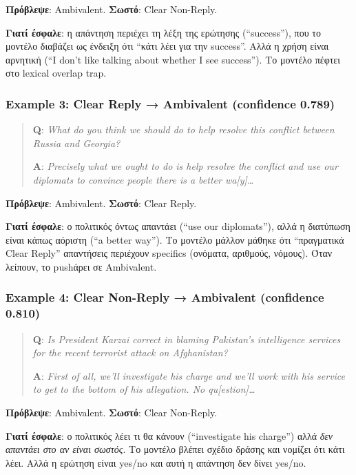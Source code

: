 \documentclass[12pt]{fphw}
\begin{document}
\textbf{Πρόβλεψε}: Ambivalent. \textbf{Σωστό}: Clear Non-Reply.

\textbf{Γιατί έσφαλε}: η απάντηση περιέχει τη λέξη της ερώτησης (``success''), που το μοντέλο διαβάζει ως ένδειξη ότι ``κάτι λέει για την success''. Αλλά η χρήση είναι αρνητική (``I don't like talking about whether I see success''). Το μοντέλο πέφτει στο lexical overlap trap.

\subsubsection{Example 3: Clear Reply → Ambivalent (confidence 0.789)}

\begin{quote}
\textbf{Q}: \emph{What do you think we should do to help resolve this conflict between Russia and Georgia?}

\textbf{A}: \emph{Precisely what we ought to do is help resolve the conflict and use our diplomats to convince people there is a better wa[y]\dots}
\end{quote}

\textbf{Πρόβλεψε}: Ambivalent. \textbf{Σωστό}: Clear Reply.

\textbf{Γιατί έσφαλε}: ο πολιτικός όντως απαντάει (``use our diplomats''), αλλά η διατύπωση είναι κάπως αόριστη (``a better way''). Το μοντέλο μάλλον μάθηκε ότι ``πραγματικά Clear Reply'' απαντήσεις περιέχουν specifics (ονόματα, αριθμούς, νόμους). Όταν λείπουν, το pushάρει σε Ambivalent.

\subsubsection{Example 4: Clear Non-Reply → Ambivalent (confidence 0.810)}

\begin{quote}
\textbf{Q}: \emph{Is President Karzai correct in blaming Pakistan's intelligence services for the recent terrorist attack on Afghanistan?}

\textbf{A}: \emph{First of all, we'll investigate his charge and we'll work with his service to get to the bottom of his allegation. No qu[estion]\dots}
\end{quote}

\textbf{Πρόβλεψε}: Ambivalent. \textbf{Σωστό}: Clear Non-Reply.

\textbf{Γιατί έσφαλε}: ο πολιτικός λέει τι θα κάνουν (``investigate his charge'') αλλά \emph{δεν απαντάει στο αν είναι σωστός}. Το μοντέλο βλέπει σχέδιο δράσης και νομίζει ότι κάτι λέει. Αλλά η ερώτηση είναι yes/no και αυτή η απάντηση δεν δίνει yes/no.
\end{document}
